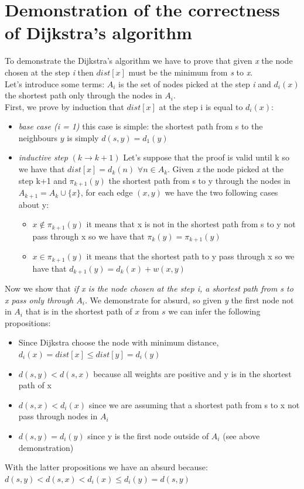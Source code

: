 \documentclass[10pt,a4paper]{book}
\begin{document}
		\section{Demonstration of the correctness of  Dijkstra's algorithm}
		To demonstrate the Dijkstra's algorithm we have to prove that given \textit{x} the node chosen at the step \textit{i} then $ dist[x] $ must be the minimum from \textit{s} to \textit{x}.\\
			Let's introduce some terms: $ A_i $ is the set of nodes picked at the step \textit{i} and $ d_i(x) $ the shortest path only through the nodes in $ A_i $.\\
			First, we prove by induction that $ dist[x] $ at the step i is equal to $ d_i(x) $:
			\begin{itemize}
				\item \textit{base case (i = 1)}  this case is simple: the shortest path from s to the neighbours $ y $ is simply $ d(s, y) = d_1(y) $
				\item \textit{inductive step} $ (k \rightarrow k+1) $ Let's suppose that the proof is valid until k so we have that $ dist[x] = d_k(n) \,\, \forall n \in A_k $. Given \textit{x} the node picked at the step k+1 and $ \pi_{k+1}(y) $ the shortest path from s to y through the nodes in $ A_{k+1} = A_k  \cup \{x\}$, for each edge $ (x, y) $ we have the two following cases about y:
				\begin{itemize}
					\item $ x \notin\pi_{k+1}(y)  $ it means that x is not in the shortest path from s to y not pass through x so we have that $ \pi_{k}(y)  = \pi_{k+1}(y)  $
					\item $ x \in\pi_{k+1}(y)  $  it means that the shortest path to y pass through x so we have that $ d_{k+1}(y) = d_k(x) + w(x,y) $
				\end{itemize}
			\end{itemize}
		Now we show that \textit{if x is the node chosen at the step i, a shortest path from s to x pass only through $ A_i $}.
		We demonstrate for absurd, so given \textit{y} the first node not in $ A_i $ that is in the shortest path of $ x  $ from $ s $ we can infer the following propositions:
		\begin{itemize}
			\item Since Dijkstra choose the node with minimum distance, $ d_i(x) =  dist[x]  \leq dist[y] = d_i(y) $
			\item $ d(s,y) < d(s,x) $ because all weights are positive and y is in the shortest path of x
			\item $ d(s,x) < d_i(x) $ since we are assuming that a shortest path from s to x not pass through nodes in $ A_i $
		 	\item  $ d(s,y) = d_i(y) $	since y is the first node outside of $ A_i $ (see above demonstration)
	\end{itemize}
	With the latter propositions we have an absurd because:\\ $ d(s,y) < d(s,x) < d_i(x) \leq d_i(y) = d(s,y) $\\
\end{document}

